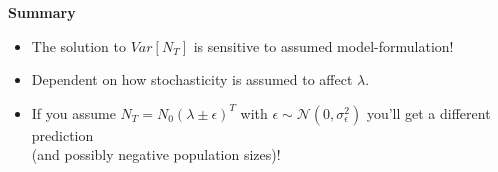 \documentclass{article}
\newcommand{\note}[1]{\colorbox{gray!20}{#1}}
\begin{document}
\textbf{Summary}
\begin{itemize}
\item The solution to $Var[N_T]$ is sensitive to assumed model-formulation!
\item Dependent on how stochasticity is assumed to affect $\lambda$.
\item If you assume $N_{T}=N_0 (\lambda \pm \epsilon)^T$ with $\epsilon \sim \mathcal{N}(0,\sigma_\epsilon^2)$ you'll get a different prediction\\
(and possibly negative population sizes)!
\end{itemize}

%
\end{document}
